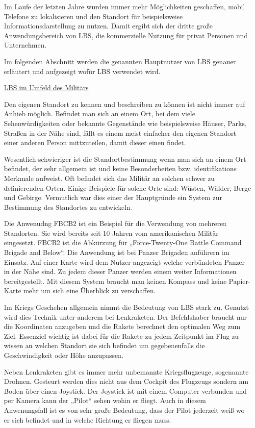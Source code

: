 Im Laufe der letzten Jahre wurden immer mehr Möglichkeiten geschaffen, mobil Telefone zu lokalisieren und den Standort für beispielsweise Informationsdarstellung zu nutzen. Damit ergibt sich der dritte große Anwendungsbereich von LBS, die kommerzielle Nutzung für privat Personen und Unternehmen.

Im folgenden Abschnitt werden die genannten Hauptnutzer von LBS genauer erläutert und aufgezeigt wofür LBS verwendet wird.


\underline{LBS im Umfeld des Militärs}

Den eigenen Standort zu kennen und beschreiben zu können ist nicht immer auf Anhieb möglich. Befindet man sich an einem Ort, bei dem viele Sehenwürdigkeiten oder bekannte Gegenstände wie beispielsweise Häuser, Parks, Straßen in der Nähe sind, fällt es einem meist einfacher den eigenen Standort einer anderen Person mittzuteilen, damit dieser einen findet.

Wesentlich schwieriger ist die Standortbestimmung wenn man sich an einem Ort befindet, der sehr allgemein ist und keine Besonderheiten bzw. identifikations Merkmale aufweist. Oft befindet sich das Militär an solchen schwer zu definierenden Orten. Einige Beispiele für solche Orte sind: Wüsten, Wälder, Berge und Gebirge. Vermutlich war dies einer der Hauptgründe ein System zur Bestimmung des Standortes zu entwickeln. 

Die Anwenudng FBCB2 ist ein Beispiel für die Verwendung von mehreren Standorten. Sie wird bereits seit 10 Jahren vom amerikanischen Militär eingesetzt. FBCB2 ist die Abkürzung für „Force-Twenty-One Battle Command Brigade and Below“. Die Anwendung ist bei Panzer Brigaden anführern im Einsatz. Auf einer Karte wird dem Nutzer angezeigt welche verbündeten Panzer in der Nähe sind. Zu jedem dieser Panzer werden einem weiter Informationen bereitgestellt. Mit diesem System braucht man keinen Kompass und keine Papier- Karte mehr um sich eine Überblick zu verschaffen. 

Im Kriegs Geschehen allgemein nimmt die Bedeutung von LBS stark zu. Genutzt wird dies Technik unter anderem bei Lenkraketen. Der Befehlshaber braucht nur die Koordinaten anzugeben und die Rakete berechnet den optimalen Weg zum Ziel. Essenziel wichtig ist dabei für die Rakete zu jedem Zeitpunkt im Flug zu wissen an welchen Standort sie sich befindet um gegebenenfalls die Geschwindigkeit oder Höhe anzupassen. 

Neben Lenkraketen gibt es immer mehr unbemannte Kriegsflugzeuge, sogenannte Drohnen. Gesteurt werden dies nicht aus dem Cockpit des Flugzeugs sondern am Boden über einen Joystick. Der Joystick ist mit einem Computer verbunden und per Kamera kann der „Pilot“ sehen wohin er fliegt. Auch in diesem Anwenungsfall ist es von sehr große Bedeutung, dass der Pilot jederzeit weiß wo er sich befindet und in welche Richtung er fliegen muss.

